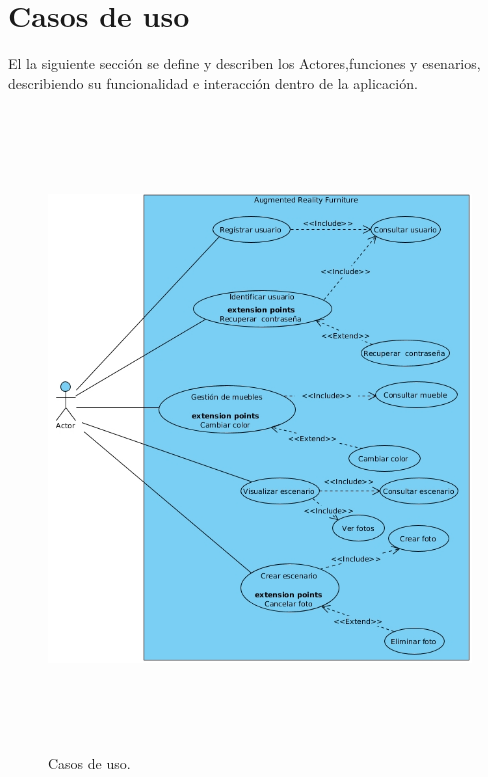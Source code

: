 
\newpage
\section{Casos de uso}
El la siguiente sección se define y describen los Actores,funciones y esenarios, describiendo su funcionalidad e interacción dentro de la aplicación.\par
\vspace{5mm}
\begin{figure}[h!]
	\centering
	\includegraphics[width=15cm,height=17cm]{imagenes/analisis/casosDeUso.jpg}
	\caption{Casos de uso.}
	\label{fig:analogo}
\end{figure}  
\newpage

